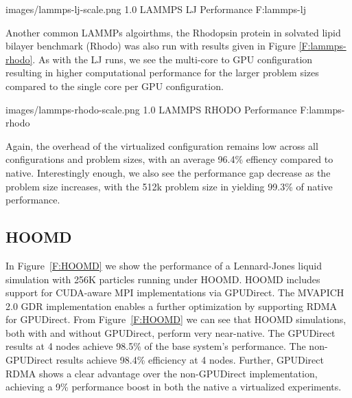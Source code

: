 \documentclass[times,10pt,twocolumn,conference]{IEEEtran}
\begin{document}

  {images/lammps-lj-scale.png}
  {1.0}
  {LAMMPS LJ Performance}
  {F:lammps-lj}


Another common LAMMPs algoirthms, the Rhodopsin protein in solvated lipid bilayer benchmark (Rhodo) was also run with results given in Figure \ref{F:lammps-rhodo}. As with the LJ runs, we see the multi-core to GPU configuration resulting in higher computational performance for the larger problem sizes compared to the single core per GPU configuration.  

  {images/lammps-rhodo-scale.png}
  {1.0}
  {LAMMPS RHODO Performance}
  {F:lammps-rhodo}

Again, the overhead of the virtualized configuration remains low across all configurations and problem sizes, with an average 96.4\% effiency compared to native. Interestingly enough, we also see the performance gap decrease as the problem size increases, with the 512k problem size in yielding 99.3\% of native performance.




\subsection{HOOMD}







In Figure~\ref{F:HOOMD} we show the performance of a Lennard-Jones liquid
simulation with 256K particles running under HOOMD.  HOOMD includes support for
CUDA-aware MPI implementations via GPUDirect.  The MVAPICH 2.0 GDR
implementation enables a further optimization by supporting RDMA for GPUDirect.
From Figure~\ref{F:HOOMD} we can see that HOOMD simulations, both with and
without GPUDirect, perform very near-native.  The GPUDirect results at 4 nodes
achieve 98.5\% of the base system's performance.  The non-GPUDirect results
achieve 98.4\% efficiency at 4 nodes.  Further, GPUDirect RDMA shows a clear advantage over the non-GPUDirect
implementation, achieving a 9\% performance boost in both the native a
virtualized experiments.
\end{document}
